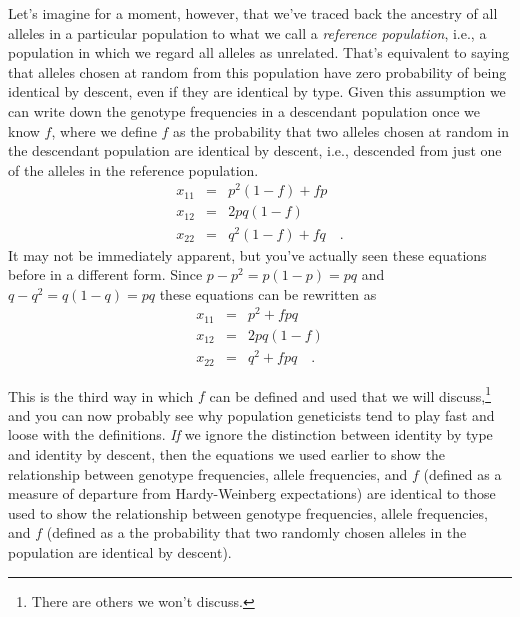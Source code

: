\documentclass[12pt]{article}
\begin{document}
Let's imagine for a moment, however, that we've traced back the
ancestry of all alleles in a particular population to what we call a
{\it reference population\/}, i.e., a population in which we regard
all alleles as unrelated. That's equivalent
to saying that alleles chosen at random from this population have zero
probability of being identical by descent, even if they are identical
by type. Given this assumption we
can write down the genotype frequencies in a descendant population
once we know $f$, where we define $f$ as the probability that two
alleles chosen at random in the descendant population are identical by
descent, i.e., descended from just one of the alleles in the reference
population.
\begin{eqnarray}
x_{11} &=& p^2(1-f) + fp \\
x_{12} &=& 2pq(1-f) \\
x_{22} &=& q^2(1-f) + fq \quad .
\end{eqnarray}
It may not be immediately apparent, but you've actually seen these
equations before in a different form.  Since $p - p^2 = p(1-p) = pq$
and $q - q^2 = q(1-q) = pq$ these equations can be rewritten as
\begin{eqnarray}
x_{11} &=& p^2 + fpq \\
x_{12} &=& 2pq(1-f) \\
x_{22} &=& q^2 + fpq \quad .
\end{eqnarray}

This is the third way in which $f$ can be defined and used that we
will discuss,\footnote{There are others we won't discuss.} and you can
now probably see why population geneticists tend to play fast and
loose with the definitions. {\it If\/} we ignore the distinction
between identity by type and identity by descent, then the equations
we used earlier to show the relationship between genotype frequencies,
allele frequencies, and $f$ (defined as a measure of departure from
Hardy-Weinberg expectations) are identical to those used to show the
relationship between genotype frequencies, allele frequencies, and $f$
(defined as a the probability that two randomly chosen alleles in the
population are identical by descent).




\ccLicense
                
\end{document}
